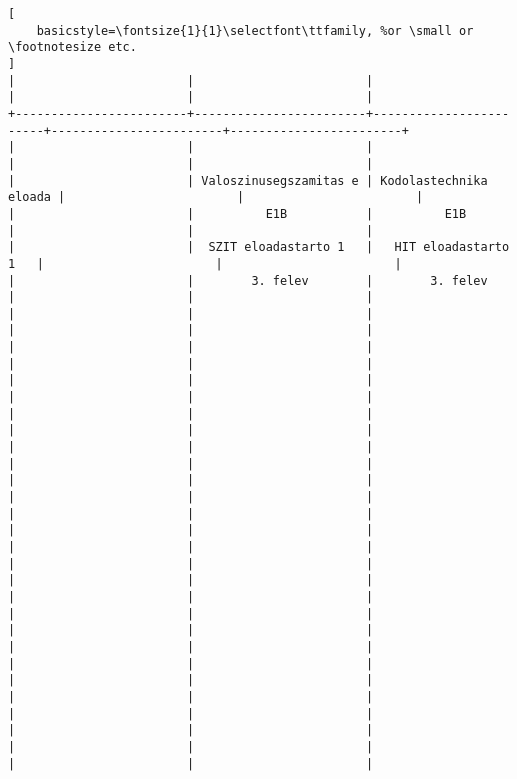 \begin{lstlisting}[
    basicstyle=\fontsize{1}{1}\selectfont\ttfamily, %or \small or \footnotesize etc.
]
|                        |                        |                        |                        |                        | 
+------------------------+------------------------+------------------------+------------------------+------------------------+
|                        |                        |                        |                        |                        | 
|                        | Valoszinusegszamitas e | Kodolastechnika eloada |                        |                        | 
|                        |          E1B           |          E1B           |                        |                        | 
|                        |  SZIT eloadastarto 1   |   HIT eloadastarto 1   |                        |                        | 
|                        |        3. felev        |        3. felev        |                        |                        | 
|                        |                        |                        |                        |                        | 
|                        |                        |                        |                        |                        | 
|                        |                        |                        |                        |                        | 
|                        |                        |                        |                        |                        | 
|                        |                        |                        |                        |                        | 
|                        |                        |                        |                        |                        | 
|                        |                        |                        |                        |                        | 
|                        |                        |                        |                        |                        | 
|                        |                        |                        |                        |                        | 
|                        |                        |                        |                        |                        | 
|                        |                        |                        |                        |                        | 
|                        |                        |                        |                        |                        | 
|                        |                        |                        |                        |                        | 
|                        |                        |                        |                        |                        | 

\end{lstlisting}
